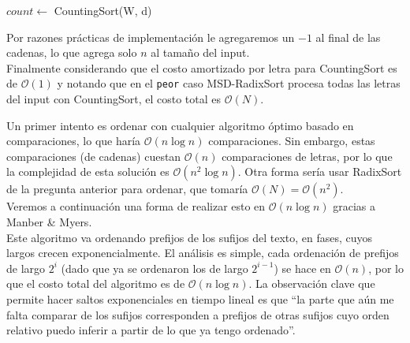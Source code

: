 \documentclass[dcc,uchile]{fcfmcourse}
\theoremstyle{plain}
\theoremstyle{definition}
\begin{document}
\begin{problems}
\begin{enumerate}[a)]
\begin{algorithm}[H]
{            $count \gets$ CountingSort(W, d)\\
        }
    \end{algorithm}
    Por razones prácticas de implementación le agregaremos un $-1$ al final de las cadenas, lo que agrega solo $n$ al tamaño del input.\\
    Finalmente considerando que el costo amortizado por letra para CountingSort es de $\mathcal{O}(1)$ y notando que en el \texttt{peor} caso MSD-RadixSort procesa todas las letras del input con CountingSort, el costo total es $\mathcal{O}(N)$.
\end{enumerate}
\item Un primer intento es ordenar con cualquier algoritmo óptimo basado en comparaciones, lo que haría $\mathcal{O}(n\log{n})$ comparaciones. Sin embargo, estas comparaciones (de cadenas) cuestan $\mathcal{O}(n)$ comparaciones de letras, por lo que la complejidad de esta solución es $\mathcal{O}(n^2\log{n})$. Otra forma sería usar RadixSort de la pregunta anterior para ordenar, que tomaría $\mathcal{O}(N) = \mathcal{O}(n^2)$.\\
Veremos a continuación una forma de realizar esto en $\mathcal{O}(n\log{n})$ gracias a Manber \& Myers.\\

Este algoritmo va ordenando prefijos de los sufijos del texto, en fases, cuyos largos crecen exponencialmente. El análisis es simple, cada ordenación de prefijos de largo $2^i$ (dado que ya se ordenaron los de largo $2^{i-1}$) se hace en $\mathcal{O}(n)$, por lo que el costo total del algoritmo es de $\mathcal{O}(n\log{n})$. La observación clave que permite hacer saltos exponenciales en tiempo lineal es que ``la parte que aún me falta comparar de los sufijos corresponden a prefijos de otras sufijos cuyo orden relativo puedo inferir a partir de lo que ya tengo ordenado''.\\


\end{problems}
\end{document}
